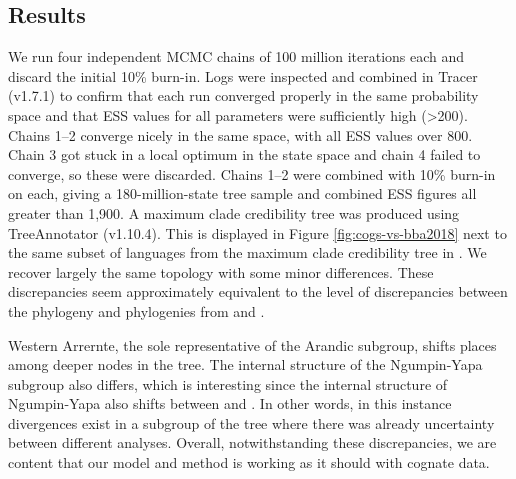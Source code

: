 \documentclass[]{article}
\begin{document}
\hypertarget{results-prelim-2}{%
\subsection{Results}\label{results-prelim-2}}

We run four independent MCMC chains of 100 million iterations each and discard the initial 10\% burn-in. Logs were inspected and combined in Tracer (v1.7.1) to confirm that each run converged properly in the same probability space and that ESS values for all parameters were sufficiently high (\textgreater{}200). Chains 1--2 converge nicely in the same space, with all ESS values over 800. Chain 3 got stuck in a local optimum in the state space and chain 4 failed to converge, so these were discarded. Chains 1--2 were combined with 10\% burn-in on each, giving a 180-million-state tree sample and combined ESS figures all greater than 1,900. A maximum clade credibility tree was produced using TreeAnnotator (v1.10.4). This is displayed in Figure \ref{fig:cogs-vs-bba2018} next to the same subset of languages from the maximum clade credibility tree in \textcite{bouckaert_origin_2018}. We recover largely the same topology with some minor differences. These discrepancies seem approximately equivalent to the level of discrepancies between the \textcite{bouckaert_origin_2018} phylogeny and phylogenies from \textcite{bowern_computational_2012} and \textcite{macklin-cordes_phylogenetic_2020}.

Western Arrernte, the sole representative of the Arandic subgroup, shifts places among deeper nodes in the tree. The internal structure of the Ngumpin-Yapa subgroup also differs, which is interesting since the internal structure of Ngumpin-Yapa also shifts between \textcite{bowern_computational_2012} and \textcite{bouckaert_origin_2018}. In other words, in this instance divergences exist in a subgroup of the tree where there was already uncertainty between different analyses. Overall, notwithstanding these discrepancies, we are content that our model and method is working as it should with cognate data.
\end{document}
